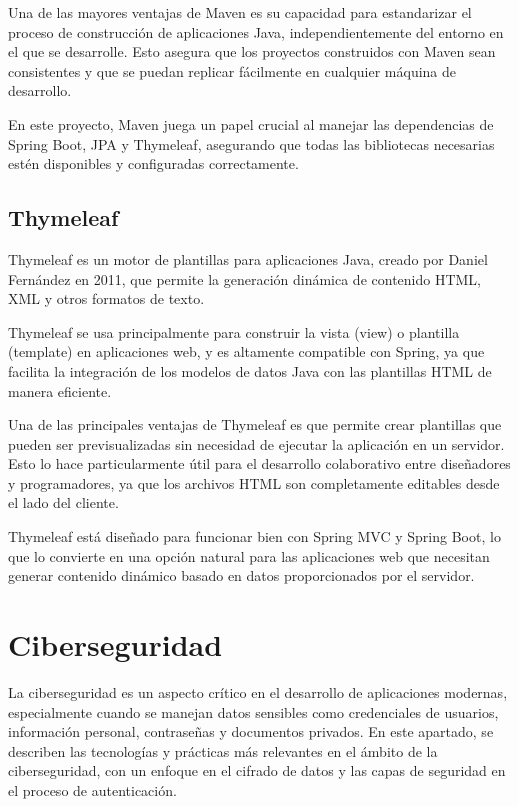 \documentclass[draft]{scrbook}
\begin{document}
Una de las mayores ventajas de Maven es su capacidad para estandarizar el proceso de construcción de aplicaciones Java, independientemente del entorno en el que se desarrolle. Esto asegura que los proyectos construidos con Maven sean consistentes y que se puedan replicar fácilmente en cualquier máquina de desarrollo.

En este proyecto, Maven juega un papel crucial al manejar las dependencias de Spring Boot, JPA y Thymeleaf, asegurando que todas las bibliotecas necesarias estén disponibles y configuradas correctamente.

\subsection{ Thymeleaf }

Thymeleaf es un motor de plantillas para aplicaciones Java, creado por Daniel Fernández en 2011, que permite la generación dinámica de contenido HTML, XML y otros formatos de texto. 

Thymeleaf se usa principalmente para construir la vista (view) o plantilla (template) en aplicaciones web, y es altamente compatible con Spring, ya que facilita la integración de los modelos de datos Java con las plantillas HTML de manera eficiente.

Una de las principales ventajas de Thymeleaf es que permite crear plantillas que pueden ser previsualizadas sin necesidad de ejecutar la aplicación en un servidor. Esto lo hace particularmente útil para el desarrollo colaborativo entre diseñadores y programadores, ya que los archivos HTML son completamente editables desde el lado del cliente.

Thymeleaf está diseñado para funcionar bien con Spring MVC y Spring Boot, lo que lo convierte en una opción natural para las aplicaciones web que necesitan generar contenido dinámico basado en datos proporcionados por el servidor.


    



    
    \section{Ciberseguridad}
\label{sec:ciberseguridad}

La ciberseguridad es un aspecto crítico en el desarrollo de aplicaciones modernas, especialmente cuando se manejan datos sensibles como credenciales de usuarios, información personal, contraseñas y documentos privados. En este apartado, se describen las tecnologías y prácticas más relevantes en el ámbito de la ciberseguridad, con un enfoque en el cifrado de datos y las capas de seguridad en el proceso de autenticación.
\end{document}
